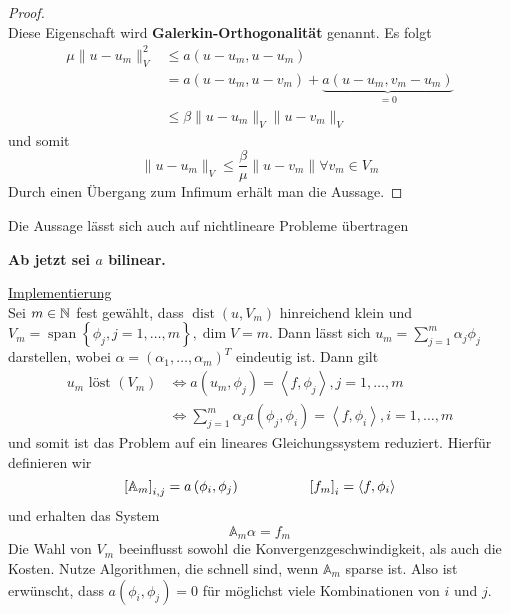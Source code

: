 \begin{enumerate}
\begin{proof}
\begin{equation*}
			\end{equation*}
			Diese Eigenschaft wird \textbf{Galerkin-Orthogonalität} genannt. Es folgt
			\begin{align*}
				\mu\|u-u_{m}\|_{V}^{2} &\leq a\left(u-u_{m},u-u_{m}\right)\\
					&= a\left(u-u_{m},u-v_{m}\right) + \underbrace{a\left(u-u_{m},v_{m}-u_{m}\right)}_{=0}\\
					&\leq \beta\|u-u_{m}\|_{V}\|u-v_{m}\|_{V}
			\end{align*}
			und somit
			\begin{equation*}
				\|u-u_{m}\|_{V}\leq \frac{\beta}{\mu}\|u-v_{m}\| \forall v_{m}\in V_{m}
			\end{equation*}
			Durch einen Übergang zum Infimum erhält man die Aussage.
		\end{proof}
		Die Aussage lässt sich auch auf nichtlineare Probleme übertragen
\end{enumerate}

\textbf{Ab jetzt sei $a$ bilinear.}

\underline{Implementierung}\\
Sei $m\in\mathbb{N}$ fest gewählt, dass $\operatorname{dist}\left(u,V_{m}\right)$ hinreichend klein und $V_{m} = \operatorname{span}\left\{\phi_{j},j=1,\dots,m\right\}, \operatorname{dim}V=m$. Dann lässt sich $u_{m} = \sum_{j=1}^{m} \alpha_{j}\phi_{j}$ darstellen, wobei $\alpha = \left(\alpha_{1},\dots,\alpha_{m}\right)^{T}$ eindeutig ist. Dann gilt
\begin{align*}
	u_{m}\text{ löst }\left(V_{m}\right) &\Leftrightarrow a\left(u_{m},\phi_{j}\right) = \left<f,\phi_{j}\right>, j=1,\dots,m\\
		&\Leftrightarrow \sum_{j=1}^{m}\alpha_{j}a\left(\phi_{j},\phi_{i}\right) = \left<f,\phi_{i}\right>, i=1,\dots,m
\end{align*}
und somit ist das Problem auf ein lineares Gleichungssystem reduziert. Hierfür definieren wir
\begin{equation*}
	\left[\mathbb{A}_{m}\right]_{i,j} = a\left(\phi_{i},\phi_{j}\right) \hspace*{5em} \left[f_{m}\right]_{i} = \left<f,\phi_{i}\right>
\end{equation*}
und erhalten das System
\begin{equation*}
	\mathbb{A}_{m} \alpha = f_{m}
\end{equation*}
Die Wahl von $V_{m}$ beeinflusst sowohl die Konvergenzgeschwindigkeit, als auch die Kosten. Nutze Algorithmen, die schnell sind, wenn $\mathbb{A}_{m}$ sparse ist. Also ist erwünscht, dass $a\left(\phi_{i},\phi_{j}\right) = 0$ für möglichst viele Kombinationen von $i$ und $j$.

